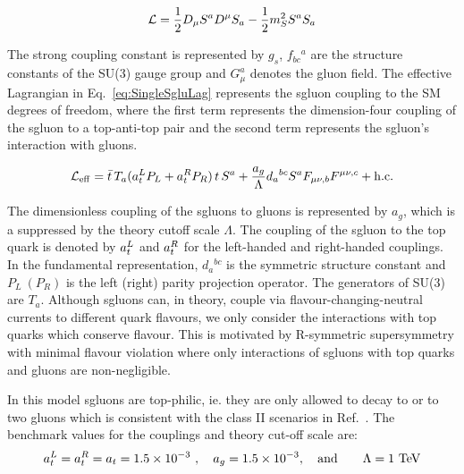\begin{equation}
 {\cal L}= \frac{1}{2}D_{\mu}S^aD^{\mu} S_a
          -\frac{1}{2}m_S^2 S^a S_a
          \label{eqn:sgluonLag}
\end{equation}



The strong coupling constant is represented by $g_s$, $f_{bc}{}^a$ are the structure
constants of the SU(3) gauge group and $G_\mu^a$ denotes the gluon field.
The effective Lagrangian in Eq.~\ref{eq:SingleSgluLag} represents the sgluon coupling to the SM degrees of freedom, where the first term represents the dimension-four coupling of the sgluon to a top-anti-top pair and the second term represents the sgluon's interaction with gluons.

\begin{equation}
 {\cal L}_{\rm eff}= \bar t\, T_a (a_t^L P_L + a_t^R P_R)\, t\, S^a
 +\frac{a_g}{\Lambda} d_a{}^{bc} S^a F_{\mu\nu, b} F^{\mu\nu, c}
 + {\rm h.c.} 
\label{eq:SingleSgluLag}\end{equation}

The dimensionless coupling of the sgluons to gluons is represented by ${a_g}$, which is a suppressed by the theory cutoff scale $\Lambda$. The coupling of the sgluon to the top quark is denoted by $a_t^L$ and  $a_t^R$ for the left-handed and right-handed couplings. In the fundamental representation, $d_a{}^{bc}$ is the symmetric structure constant and $P_{L}~(P_{R})$ is the left (right) parity projection operator. The generators of SU(3) are $T_a$.
Although sgluons can, in theory, couple via flavour-changing-neutral currents to different quark flavours, we only consider the interactions with top quarks which conserve flavour. This is motivated by R-symmetric supersymmetry with minimal flavour violation where only interactions of sgluons with top quarks and gluons are non-negligible.

In this model sgluons are top-philic, ie. they are only allowed to decay to \ttbar or to two gluons which is consistent with the class II scenarios in Ref.~\cite{Calvet:2012rk}. The benchmark values for the couplings and theory cut-off scale are:
\begin{align}
 &a_t^L = a_t^R = a_t = 1.5\times 10^{-3}\ , \quad
 a_g = 1.5\times 10^{-3},\nonumber \quad\text{and}\quad&\Lambda = 1~{\rm TeV}
 \label{eq:benchmark}
\end{align}

